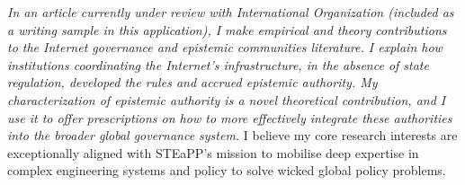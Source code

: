 \documentclass[11pt]{letter}
\begin{document}
\begin{letter}
%
%
%
%
\emph{In an article currently under review with International Organization (included as a writing sample in this application), I make empirical and theory contributions to the Internet governance and epistemic communities literature.
%
I explain how institutions coordinating the Internet's infrastructure, in the absence of state regulation, developed the rules and accrued epistemic authority.
%
My characterization of epistemic authority is a novel theoretical contribution, and I use it to offer prescriptions on how to more effectively integrate these authorities into the broader global governance system. 
}
%
%
I believe my core research interests are exceptionally aligned with STEaPP's mission to mobilise deep expertise in complex engineering systems and policy to solve wicked global policy problems.


\end{letter}
\end{document}
